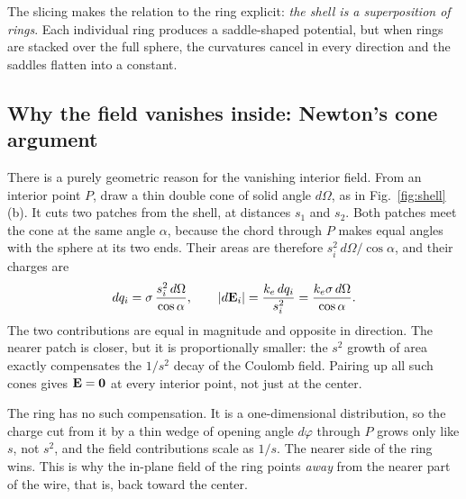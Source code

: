 \documentclass[11pt,a4paper]{article}
\newcommand{\ke}{k_e}
\begin{document}
The slicing makes the relation to the ring explicit: \emph{the shell is a superposition of rings}. Each individual ring produces a saddle-shaped potential, but when rings are stacked over the full sphere, the curvatures cancel in every direction and the saddles flatten into a constant.

\subsection{Why the field vanishes inside: Newton's cone argument}

There is a purely geometric reason for the vanishing interior field. From an interior point $P$, draw a thin double cone of solid angle $d\Omega$, as in Fig.~\ref{fig:shell}(b). It cuts two patches from the shell, at distances $s_1$ and $s_2$. Both patches meet the cone at the same angle $\alpha$, because the chord through $P$ makes equal angles with the sphere at its two ends. Their areas are therefore $s_i^2\,d\Omega/\cos\alpha$, and their charges are
\begin{equation}
dq_i = \sigma\,\frac{s_i^2\,d\Omega}{\cos\alpha},
\qquad
\abs{d\vb E_i} = \frac{\ke\,dq_i}{s_i^2} = \frac{\ke\sigma\,d\Omega}{\cos\alpha}.
\end{equation}
The two contributions are equal in magnitude and opposite in direction. The nearer patch is closer, but it is proportionally smaller: the $s^2$ growth of area exactly compensates the $1/s^2$ decay of the Coulomb field. Pairing up all such cones gives $\vb E=\vb 0$ at every interior point, not just at the center.

The ring has no such compensation. It is a one-dimensional distribution, so the charge cut from it by a thin wedge of opening angle $d\varphi$ through $P$ grows only like $s$, not $s^2$, and the field contributions scale as $1/s$. The nearer side of the ring wins. This is why the in-plane field of the ring points \emph{away} from the nearer part of the wire, that is, back toward the center.
\end{document}
